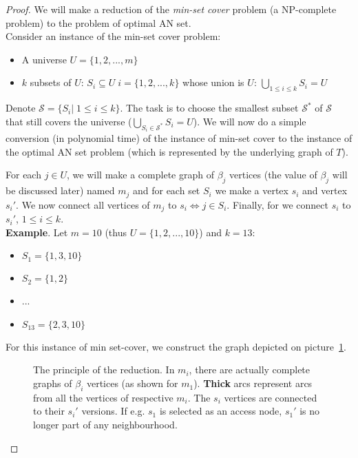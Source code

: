 		\begin{proof}
			We will make a reduction of the \textit{min-set cover} problem (a NP-complete problem) to the problem of optimal AN set. \\
			
			\noindent Consider an instance of the min-set cover problem:
			\begin{itemize}
				\item A universe $U = \{1, 2, ..., m\}$
				\item $k$ subsets of $U$: $S_{i} \subseteq U \; i = \{1, 2, ..., k\}$ whose union is $U$: $\bigcup\limits_{1 \leq i \leq k} S_{i} = U$
			\end{itemize}
			\hspace*{\fill}
			
			\noindent Denote $\mathcal{S} = \{S_{i}| \; 1 \leq i \leq k\}$. The task is to choose the smallest subset $\mathcal{S}^{*}$ of $\mathcal{S}$ that still covers the universe ($\bigcup\limits_{S_{i} \in \mathcal{S}^{*}} S_{i} = U$). We will now do a simple conversion (in polynomial time) of the instance of min-set cover to the instance of the optimal AN set problem (which is represented by the underlying graph of $T$).
			
			 For each $j \in U$, we will make a complete graph of $\beta_{j}$ vertices (the value of $\beta_{j}$ will be discussed later) named $m_{j}$ and for each set $S_{i}$ we make a vertex $s_{i}$ and vertex $s_{i}'$. We now connect all vertices of $m_{j}$ to $s_{i} \iff j \in S_{i}$. Finally, for we connect $s_{i}$ to $s_{i}'$, $1 \leq i \leq k$. \\
			 
			\noindent \textbf{Example}. Let $m = 10$ (thus $U = \{1, 2, ..., 10\}$) and $k = 13$:
			\begin{itemize}
				\item $S_{1} = \{1, 3, 10\}$
			 	\item $S_{2} = \{1, 2\}$
			 	\item ...
			 	\item $S_{13} = \{2, 3, 10\}$
			\end{itemize}
			\hspace*{\fill}
			 
			\noindent For this instance of min set-cover, we construct the graph depicted on picture~\ref{fig:reduction}.
			 
			\begin{figure}[h!]
				\begin{center}
				\end{center}
				\caption{\label{fig:reduction} The principle of the reduction. In $m_{i}$, there are actually complete graphs of $\beta_{i}$ vertices (as shown for $m_{1}$). \textbf{Thick} arcs represent arcs from all the vertices of respective $m_{i}$. The $s_{i}$ vertices are connected to their $s_{i}'$ versions. If e.g. $s_{1}$ is selected as an access node, $s_{1}'$ is no longer part of any neighbourhood.}
			\end{figure}
			

\end{proof}
